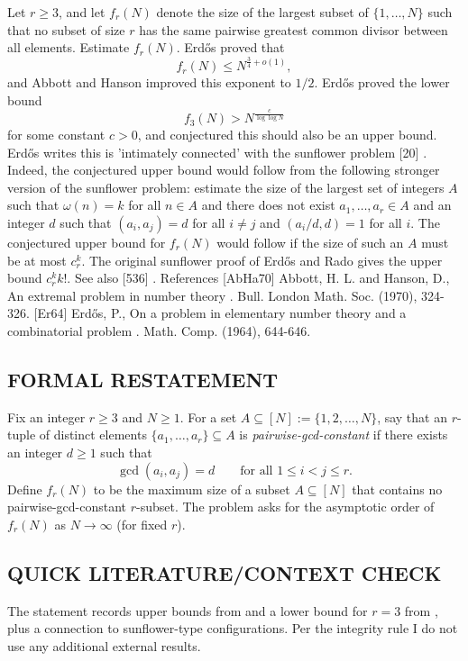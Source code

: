 Let $r\geq 3$, and let $f_r(N)$ denote the size of the largest subset of $\{1,\ldots,N\}$ such that no subset of size $r$ has the same pairwise greatest common divisor between all elements. Estimate $f_r(N)$. Erd\H{o}s \cite{Er64} proved that\[f_r(N) \leq N^{\frac{3}{4}+o(1)},\]and Abbott and Hanson \cite{AbHa70} improved this exponent to $1/2$. Erd\H{o}s \cite{Er64} proved the lower bound\[f_3(N) > N^{\frac{c}{\log\log N}}\]for some constant $c>0$, and conjectured this should also be an upper bound. Erd\H{o}s writes this is 'intimately connected' with the sunflower problem [20] . Indeed, the conjectured upper bound would follow from the following stronger version of the sunflower problem: estimate the size of the largest set of integers $A$ such that $\omega(n)=k$ for all $n\in A$ and there does not exist $a_1,\ldots,a_r\in A$ and an integer $d$ such that $(a_i,a_j)=d$ for all $i\neq j$ and $(a_i/d,d)=1$ for all $i$. The conjectured upper bound for $f_r(N)$ would follow if the size of such an $A$ must be at most $c_r^k$. The original sunflower proof of Erd\H{o}s and Rado gives the upper bound $c_r^kk!$. See also [536] . References [AbHa70] Abbott, H. L. and Hanson, D., An extremal problem in number theory . Bull. London Math. Soc. (1970), 324-326. [Er64] Erd\H{o}s, P., On a problem in elementary number theory and a combinatorial problem . Math. Comp. (1964), 644-646.


\subsection*{FORMAL RESTATEMENT}
Fix an integer $r\ge 3$ and $N\ge 1$. For a set $A\subseteq [N]:=\{1,2,\dots,N\}$, say that an $r$-tuple of distinct elements $\{a_1,\dots,a_r\}\subseteq A$ is \emph{pairwise-gcd-constant} if there exists an integer $d\ge 1$ such that
\[
\gcd(a_i,a_j)=d\qquad\text{for all }1\le i<j\le r.
\]
Define $f_r(N)$ to be the maximum size of a subset $A\subseteq [N]$ that contains no pairwise-gcd-constant $r$-subset. The problem asks for the asymptotic order of $f_r(N)$ as $N\to\infty$ (for fixed $r$).

\subsection*{QUICK LITERATURE/CONTEXT CHECK}
The statement records upper bounds from \cite{Er64,AbHa70} and a lower bound for $r=3$ from \cite{Er64}, plus a connection to sunflower-type configurations. Per the integrity rule I do not use any additional external results.

